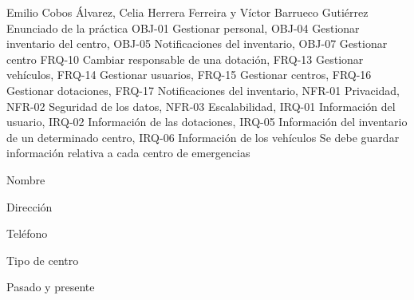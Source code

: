 {Emilio Cobos Álvarez, Celia Herrera Ferreira y Víctor Barrueco Gutiérrez}
{Enunciado de la práctica}
{OBJ-01 Gestionar personal, OBJ-04 Gestionar inventario del centro, OBJ-05 Notificaciones del inventario, OBJ-07 Gestionar centro}
{FRQ-10 Cambiar responsable de una dotación, FRQ-13 Gestionar vehículos, FRQ-14 Gestionar usuarios, FRQ-15 Gestionar centros, FRQ-16 Gestionar dotaciones, FRQ-17 Notificaciones del inventario, NFR-01 Privacidad, NFR-02 Seguridad de los datos, NFR-03 Escalabilidad, IRQ-01 Información del usuario, IRQ-02 Información de las dotaciones, IRQ-05 Información del inventario de un determinado centro, IRQ-06 Información de los vehículos}
{Se debe guardar información relativa a cada centro de emergencias}
{
\item{Nombre}
\item{Dirección}
\item{Teléfono}
\item{Tipo de centro}
}
{Pasado y presente}

